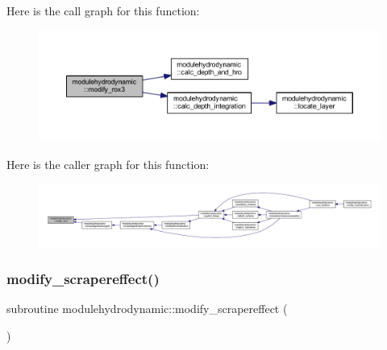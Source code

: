 Here is the call graph for this function\+:\nopagebreak
\begin{figure}[H]
\begin{center}
\leavevmode
\includegraphics[width=350pt]{namespacemodulehydrodynamic_a9f3d6185fb652a067c6f42b46723a9cc_cgraph}
\end{center}
\end{figure}
Here is the caller graph for this function\+:\nopagebreak
\begin{figure}[H]
\begin{center}
\leavevmode
\includegraphics[width=350pt]{namespacemodulehydrodynamic_a9f3d6185fb652a067c6f42b46723a9cc_icgraph}
\end{center}
\end{figure}
\mbox{\label{namespacemodulehydrodynamic_a9f02295d5c7e337e76ec98febfebdc0b}} 
\subsubsection{\texorpdfstring{modify\+\_\+scrapereffect()}{modify\_scrapereffect()}}
{\footnotesize\ttfamily subroutine modulehydrodynamic\+::modify\+\_\+scrapereffect (\begin{DoxyParamCaption}{ }\end{DoxyParamCaption})\hspace{0.3cm}{\ttfamily [private]}}

